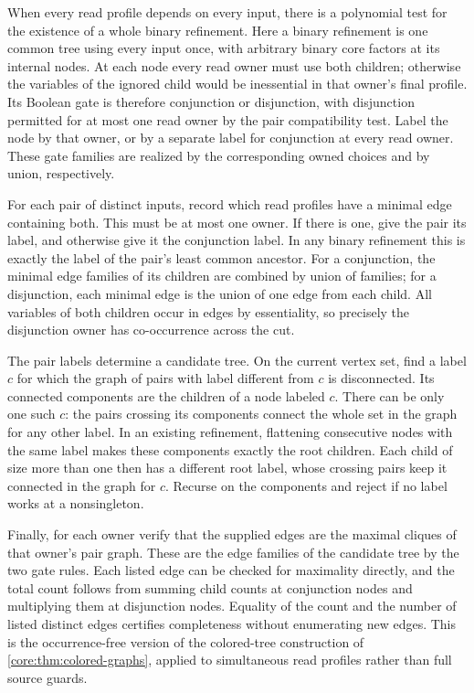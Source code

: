 When every read profile depends on every input, there is a
polynomial test for the existence of a whole binary refinement.
Here a binary refinement is one common tree using every input
once, with arbitrary binary core factors at its internal nodes.
At each node every read owner must use both children; otherwise
the variables of the ignored child would be inessential in that
owner's final profile. Its Boolean gate is therefore conjunction
or disjunction, with disjunction permitted for at most one read
owner by the pair compatibility test. Label the node by that
owner, or by a separate label for conjunction at every read
owner. These gate families are realized by the corresponding
owned choices and by union, respectively.

For each pair of distinct inputs, record which read profiles
have a minimal edge containing both. This must be at most one
owner. If there is one, give the pair its label, and otherwise
give it the conjunction label. In any binary refinement this
is exactly the label of the pair's least common ancestor. For
a conjunction, the minimal edge families of its children are
combined by union of families; for a disjunction, each minimal
edge is the union of one edge from each child. All variables
of both children occur in edges by essentiality, so precisely
the disjunction owner has co-occurrence across the cut.

The pair labels determine a candidate tree. On the current
vertex set, find a label $c$ for which the graph of pairs with
label different from $c$ is disconnected. Its connected
components are the children of a node labeled $c$. There can
be only one such $c$: the pairs crossing its components connect
the whole set in the graph for any other label. In an existing
refinement, flattening consecutive nodes with the same label
makes these components exactly the root children. Each child
of size more than one then has a different root label, whose
crossing pairs keep it connected in the graph for $c$. Recurse
on the components and reject if no label works at a nonsingleton.

Finally, for each owner verify that the supplied edges are the
maximal cliques of that owner's pair graph. These are the edge
families of the candidate tree by the two gate rules. Each
listed edge can be checked for maximality directly, and the
total count follows from summing child counts at conjunction
nodes and multiplying them at disjunction nodes. Equality of
the count and the number of listed distinct edges certifies
completeness without enumerating new edges. This is the
occurrence-free version of the colored-tree construction of
\cref{core:thm:colored-graphs}, applied to simultaneous read
profiles rather than full source guards.

